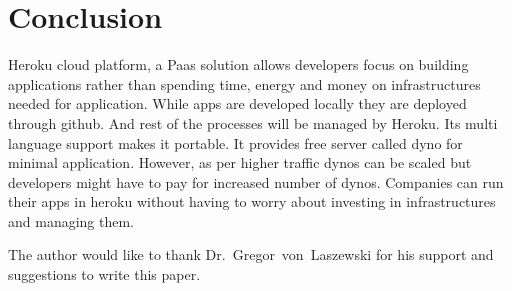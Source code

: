 \section{Conclusion}

 Heroku cloud platform, a Paas solution allows developers focus on building 
 applications rather than spending time, energy and money on infrastructures
 needed for application. While apps are developed locally they are deployed
 through github. And rest of the processes will be managed by Heroku. Its
 multi language support makes it portable. It provides free server called dyno
 for minimal application. However, as per higher traffic dynos can be scaled but
 developers might have to pay for increased number of dynos. Companies can run
 their apps in heroku without having to worry about investing in infrastructures
 and managing them.


\begin{acks}

  The author would like to thank Dr.~Gregor~von~Laszewski for his
  support and suggestions to write this paper.

\end{acks}


 

